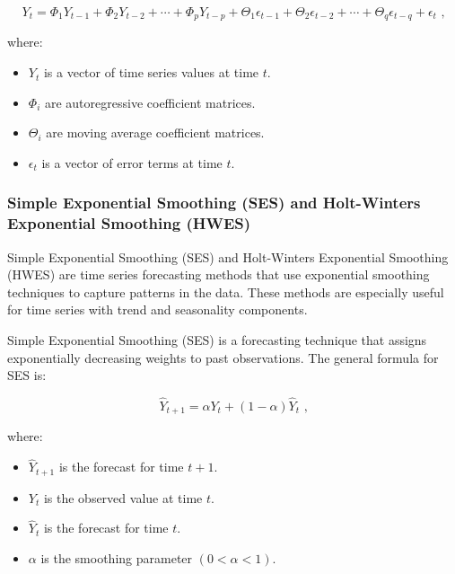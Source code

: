 \begin{equation}
Y_t = \Phi_1 Y_{t-1} + \Phi_2 Y_{t-2} + \cdots + \Phi_p Y_{t-p} + \Theta_1 \epsilon_{t-1} + \Theta_2 \epsilon_{t-2} + \cdots + \Theta_q \epsilon_{t-q} + \epsilon_t \text{ ,}
\end{equation}

where:
\begin{itemize}
    \item \( Y_t \) is a vector of time series values at time \( t \).
    \item \( \Phi_i \) are autoregressive coefficient matrices.
    \item \( \Theta_i \) are moving average coefficient matrices.
    \item \( \epsilon_t \) is a vector of error terms at time \( t \).
\end{itemize}
\vspace{10pt}

\subsubsection{Simple Exponential Smoothing (SES) and Holt-Winters Exponential Smoothing (HWES)}

Simple Exponential Smoothing (SES) and Holt-Winters Exponential Smoothing (HWES) are time series forecasting methods that use exponential smoothing techniques to capture patterns in the data. These methods are especially useful for time series with trend and seasonality components.
\vspace{10pt}

Simple Exponential Smoothing (SES) is a forecasting technique that assigns exponentially decreasing weights to past observations. The general formula for SES is:

\begin{equation}
\hat{Y}_{t+1} = \alpha Y_t + (1-\alpha) \hat{Y}_t \text{ ,}
\end{equation}

where:
\begin{itemize}
    \item \( \hat{Y}_{t+1} \) is the forecast for time \( t+1 \).
    \item \( Y_t \) is the observed value at time \( t \).
    \item \( \hat{Y}_t \) is the forecast for time \( t \).
    \item \( \alpha \) is the smoothing parameter \( (0 < \alpha < 1) \).
\end{itemize}

